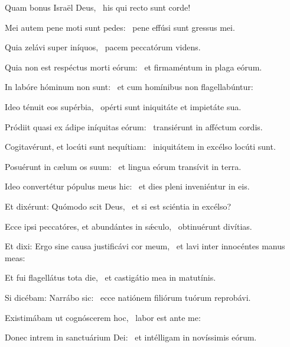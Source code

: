 \item Quam bonus Israël Deus,~\psstar{} his qui recto sunt corde!

\item Mei autem pene moti sunt pedes:~\psstar{} pene effúsi sunt gressus mei.

\item Quia zelávi super iníquos,~\psstar{} pacem peccatórum videns.

\item Quia non est respéctus morti eórum:~\psstar{} et firmaméntum in plaga eórum.

\item In labóre hóminum non sunt:~\psstar{} et cum homínibus non flagellabúntur:

\item Ideo ténuit eos supérbia,~\psstar{} opérti sunt iniquitáte et impietáte sua.

\item Pródiit quasi ex ádipe iníquitas eórum:~\psstar{} transiérunt in afféctum cordis.

\item Cogitavérunt, et locúti sunt nequítiam:~\psstar{} iniquitátem in excélso locúti sunt.

\item Posuérunt in cælum os suum:~\psstar{} et lingua eórum transívit in terra.

\item Ideo convertétur pópulus meus hic:~\psstar{} et dies pleni inveniéntur in eis.

\item Et dixérunt: Quómodo scit Deus,~\psstar{} et si est sciéntia in excélso?

\item Ecce ipsi peccatóres, et abundántes in sǽculo,~\psstar{} obtinuérunt divítias.

\item Et dixi: Ergo sine causa justificávi cor meum,~\psstar{} et lavi inter innocéntes manus meas:

\item Et fui flagellátus tota die,~\psstar{} et castigátio mea in matutínis.

\item Si dicébam: Narrábo sic:~\psstar{} ecce natiónem filiórum tuórum reprobávi.

\item Existimábam ut cognóscerem hoc,~\psstar{} labor est ante me:

\item Donec intrem in sanctuárium Dei:~\psstar{} et intélligam in novíssimis eórum.

